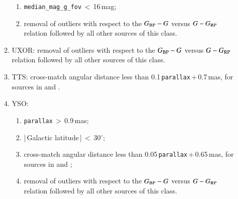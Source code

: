\documentclass[longauth]{aa}
\def\bpg{\mbox{$G_{\rm BP}-G$}\xspace}
\def\grp{\mbox{$G-G_{\rm RP}$}\xspace}
\begin{document}
\begin{appendix}
\begin{enumerate}
\begin{enumerate}
\begin{enumerate}
            \item \texttt{median\_mag\_g\_fov}\,$<$\,16\,mag;
            \item removal of outliers with respect to the \bpg versus \grp relation followed by all other sources of this class.
        \end{enumerate}
        \item UXOR: removal of outliers with respect to the \bpg versus \grp relation followed by all other sources of this class.
        \item TTS: cross-match angular distance less than 0.1\,\texttt{parallax}\,+\,0.7\,mas, for sources in \citet{2020IAUS..345..378V} and \citet{2006SASS...25...47W}.
        \item YSO:
          \begin{enumerate}
          \item \texttt{parallax}\,$>$\,0.9\,mas;
          \item |\,Galactic latitude\,|\,$<$\,30$^{\circ}$;
          \item cross-match angular distance less than 0.05\,\texttt{parallax}\,+\,0.65\,mas, for sources in \citet{2020IAUS..345..378V} and \citet{2006SASS...25...47W};
          \item removal of outliers with respect to the \bpg versus \grp relation followed by all other sources of this class.
           \end{enumerate}        
    \end{enumerate}        
\end{enumerate}

\newpage


\end{appendix}
\end{document}
